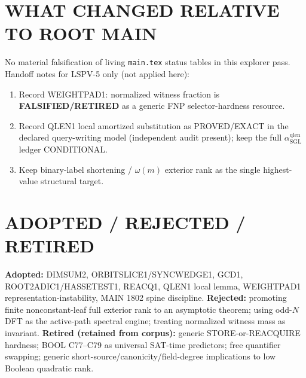 \documentclass[11pt]{article}
\begin{document}
\section*{WHAT CHANGED RELATIVE TO ROOT MAIN}
No material falsification of living \texttt{main.tex} status tables in this explorer pass.
Handoff notes for LSPV-5 only (not applied here):
\begin{enumerate}
\item Record WEIGHTPAD1: normalized witness fraction is \textbf{FALSIFIED/RETIRED} as a generic
FNP selector-hardness resource.
\item Record QLEN1 local amortized substitution as PROVED/EXACT in the declared query-writing
model (independent audit present); keep the full $\alpha_{\mathrm{SGL}}^{\mathrm{qlen}}$ ledger CONDITIONAL.
\item Keep binary-label shortening / $\omega(m)$ exterior rank as the single highest-value structural target.
\end{enumerate}

\section*{ADOPTED / REJECTED / RETIRED}
\textbf{Adopted:} DIMSUM2, ORBITSLICE1/SYNCWEDGE1, GCD1, ROOT2ADIC1/HASSETEST1, REACQ1,
QLEN1 local lemma, WEIGHTPAD1 representation-instability, MAIN 1802 spine discipline.
\textbf{Rejected:} promoting finite nonconstant-leaf full exterior rank to an asymptotic theorem;
using odd-$N$ DFT as the active-path spectral engine; treating normalized witness mass as invariant.
\textbf{Retired (retained from corpus):} generic STORE-or-REACQUIRE hardness; BOOL C77--C79 as
universal SAT-time predictors; free quantifier swapping; generic short-source/canonicity/field-degree
implications to low Boolean quadratic rank.
\end{document}
